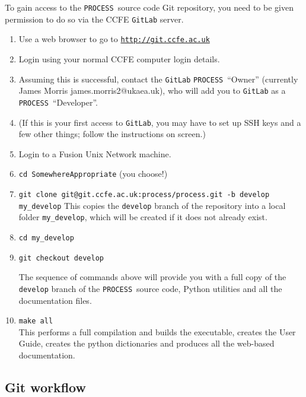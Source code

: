 \documentclass[11pt,a4paper]{report}
\newcommand{\process}{\mbox{\texttt{PROCESS}}}
\begin{document}
To gain access to the \process\ source code Git repository, you need
to be given permission to do so via the CCFE \texttt{GitLab} server.
\begin{enumerate}

\item Use a web browser to go to
  \href{http://git.ccfe.ac.uk}{\texttt{http://git.ccfe.ac.uk}}

\item Login using your normal CCFE computer login details.

\item Assuming this is successful, contact the \texttt{GitLab} \process\
  ``Owner'' (currently James Morris james.morris2@ukaea.uk), who will add you to \texttt{GitLab} as a \process\ ``Developer''.

\item (If this is your first access to \texttt{GitLab}, you may have to set up
  SSH keys and a few other things; follow the instructions on screen.)

\item Login to a Fusion Unix Network machine.

\item \texttt{cd SomewhereAppropriate} (you choose!)

\item
\texttt{git clone git@git.ccfe.ac.uk:process/process.git -b develop my\_develop}
This copies the \texttt{develop} branch of the repository into a local folder \texttt{my\_develop}, which will be created if it does not already exist.
\item \texttt{cd my\_develop}

\item \texttt{git checkout develop}

The sequence of commands above will provide you with a full copy of the \texttt{develop} branch of the \process\ source code, Python utilities and all
the documentation files.

\item \texttt{make all}\\
This performs a full compilation and builds the executable, creates the User Guide, creates the python dictionaries and produces all the web-based documentation.

\end{enumerate}


\subsection{Git workflow}
\end{document}
